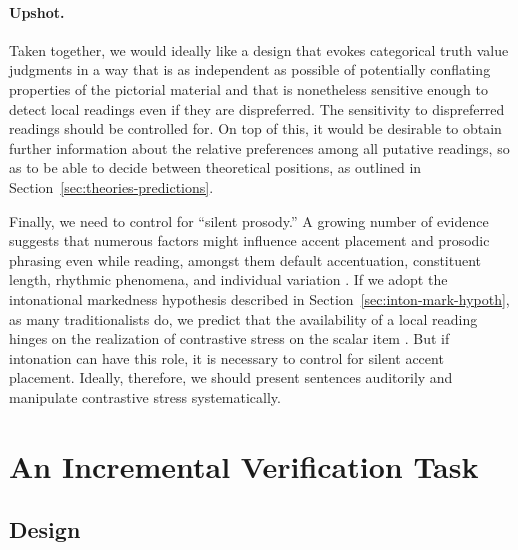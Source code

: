 \documentclass[fleqn,reqno,10pt,draft]{article}
\begin{document}
\paragraph{Upshot.} Taken together, we would ideally like a design
that evokes categorical truth value judgments in a way that is as
independent as possible of potentially conflating properties of the
pictorial material and that is nonetheless sensitive enough to detect
local readings even if they are dispreferred. The sensitivity to
dispreferred readings should be controlled for. On top of this, it
would be desirable to obtain further information about the relative
preferences among all putative readings, so as to be able to decide
between theoretical positions, as outlined in
Section~\ref{sec:theories-predictions}. %

Finally, we need to control for ``silent prosody.'' A growing number
of evidence suggests that numerous factors might influence accent
placement and prosodic phrasing even while reading, amongst them
default accentuation, constituent length, rhythmic phenomena, and
individual variation
\citep[e.g.][]{Augurzky08,Bader98,Fodor98,Fodor02,Kentner12,
  Steinhauer01}. If we adopt the intonational markedness hypothesis
described in Section~\ref{sec:inton-mark-hypoth}, as many
traditionalists do, we predict that the availability of a local
reading hinges on the realization of contrastive stress on the scalar
item
\citep[e.g.][]{Horn2006:The-Border-Wars,Geurts2009:Scalar-Implicat,Geurts2010:Quantity-Implic,Tielvan-Tiel2012:Embedded-Scalar,GeurtsTielvan-Tiel2013:Scalar-expressi}.
But if intonation can have this role, it is necessary to control for
silent accent placement. Ideally, therefore, we should present
sentences auditorily and manipulate contrastive stress systematically.


\section{An Incremental Verification Task}
\label{sec:exp}

\subsection{Design}
\label{sec:design}
\end{document}

